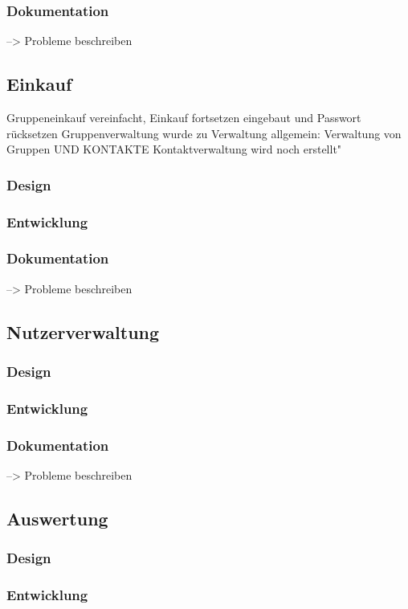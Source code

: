 \documentclass[12pt,a4paper]{article}
\begin{document}
\subsubsection*{Dokumentation} --> Probleme beschreiben
\newpage


\subsection{Einkauf}
Gruppeneinkauf vereinfacht, Einkauf fortsetzen eingebaut und Passwort rücksetzen
Gruppenverwaltung wurde zu Verwaltung allgemein:  Verwaltung von Gruppen UND KONTAKTE 
Kontaktverwaltung wird noch erstellt"
\subsubsection*{Design}
\subsubsection*{Entwicklung}
\subsubsection*{Dokumentation} --> Probleme beschreiben
\newpage

\subsection{Nutzerverwaltung}
\subsubsection*{Design}
\subsubsection*{Entwicklung}
\subsubsection*{Dokumentation} --> Probleme beschreiben
\newpage

\subsection{Auswertung}
\subsubsection*{Design}
\subsubsection*{Entwicklung}
\end{document}

